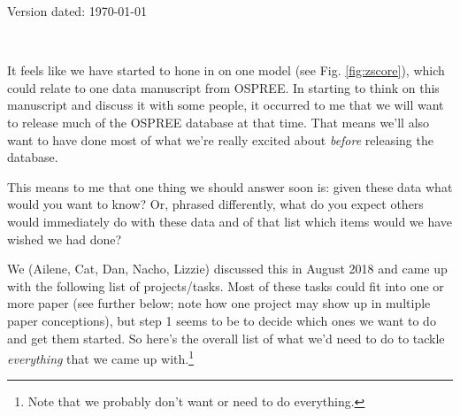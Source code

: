 \documentclass[11pt,letterpaper]{article}
\begin{document}
\begin{flushright}
Version dated: \today
\end{flushright}
\thispagestyle{empty}
\bigskip
\medskip
\begin{center}
\\
\vspace{2ex}
\bigskip
\end{center}


It feels like we have started to hone in on one model (see Fig. \ref{fig:zscore}), which could relate to one data manuscript from OSPREE. In starting to think on this manuscript and discuss it with some people, it occurred to me that we will want to release much of the OSPREE database at that time. That means we'll also want to have done most of what we're really excited about \emph{before} releasing the database. 

This means to me that one thing we should answer soon is: given these data what would you want to know? Or, phrased differently, what do you expect others would immediately do with these data and of that list which items would we have wished we had done? 

We (Ailene, Cat, Dan, Nacho, Lizzie) discussed this in August 2018 and came up with the following list of projects/tasks. Most of these tasks could fit into one or more paper (see further below; note how one project may show up in multiple paper conceptions), but step 1 seems to be to decide which ones we want to do and get them started. So here's the overall list of what we'd need to do to tackle \emph{everything} that we came up with.\footnote{Note that we probably don't want or need to do everything.}
\end{document}
